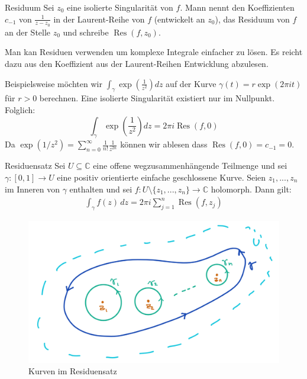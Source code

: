 \documentclass[a4paper,10pt]{article}
\DeclareMathOperator{\Res}{Res}
\begin{document}
\begin{mainbox}{Residuum}
  Sei \(z_0\) eine isolierte Singularität von \(f\). Mann nennt den Koeffizienten \(c_{-1}\) von \(\frac{1}{z-z_0}\) in der Laurent-Reihe von \(f\) (entwickelt an $z_0$), das Residuum von \(f\) an der Stelle \(z_0\) und schreibe \(\operatorname{Res}(f,z_0)\).
\end{mainbox}

Man kan Residuen verwenden um komplexe Integrale einfacher zu lösen. Es reicht dazu aus den Koeffizient aus der Laurent-Reihen Entwicklung abzulesen.

Beispielsweise möchten wir $\int_\gamma \exp(\frac{1}{z^2}) dz$ auf der Kurve $\gamma(t) = r \exp(2\pi i t)$ für $r > 0$ berechnen. Eine isolierte Singularität existiert nur im Nullpunkt. Folglich:
$$
\int_\gamma \exp \left( \frac{1}{z^2} \right) dz = 2\pi i \Res(f, 0)
$$
Da $\exp(1/z^2) = \sum_{n=0}^\infty \frac{1}{n!} \frac{1}{z^{2n}}$ können wir ablesen dass $\Res(f, 0) = c_{-1} = 0$.

\begin{mainbox}{Residuensatz}
  Sei \(U \subseteq \mathbb{C}\) eine offene wegzusammenhängende Teilmenge und sei \(\gamma : [0,1] \to U\) eine positiv orientierte einfache geschlossene Kurve. Seien \(z_1,...,z_n\) im Inneren von \(\gamma\) enthalten und sei \(f \colon U \setminus \{z_1,...,z_n\} \to \mathbb{C}\) holomorph. Dann gilt: \begin{align*}  \int_{\gamma} f(z)\,dz = 2\pi i \sum_{j=1}^n \operatorname{Res}(f,z_j) \end{align*}
\end{mainbox}


\begin{figure}[H]
  \centering 
  \includegraphics[width=0.9\linewidth]{assets/4-2-1.png}
  \caption{Kurven im Residuensatz}
\end{figure}
\end{document}
